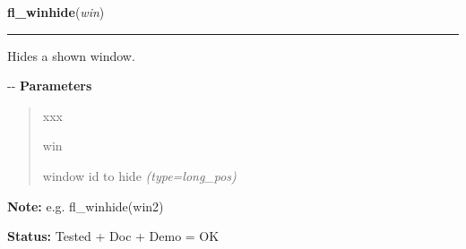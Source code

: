 \hspace{.8\funcindent}\begin{boxedminipage}{\funcwidth}

    \raggedright \textbf{fl\_winhide}(\textit{win})

    \vspace{-1.5ex}

    \rule{\textwidth}{0.5\fboxrule}
\setlength{\parskip}{2ex}

Hides a shown window.

-{}-
\setlength{\parskip}{1ex}
      \textbf{Parameters}
      \vspace{-1ex}

      \begin{quote}
        \begin{Ventry}{xxx}

          \item[win]


window id to hide
            {\it (type=long\_pos)}

        \end{Ventry}

      \end{quote}

\textbf{Note:} 
e.g. fl\_winhide(win2)


\textbf{Status:} 
Tested + Doc + Demo = OK


    \end{boxedminipage}

    \label{xformslib:flxbasic:fl_winclose}

    \vspace{0.5ex}

